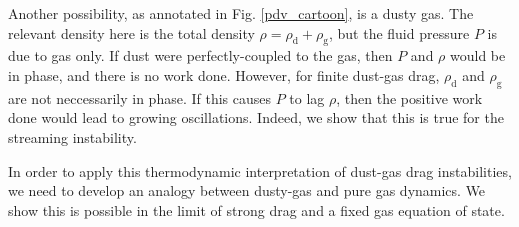 \documentclass[iop, numberedappendix]{emulateapj}
\newcommand{\rhod}{\rho_\mathrm{d}}
\newcommand{\rhog}{\rho_\mathrm{g}}
\begin{document}

Another possibility, as annotated in Fig. \ref{pdv_cartoon}, is a dusty gas. The
relevant density here is the total density $\rho = \rhod + \rhog$, 
but the fluid pressure $P$ is due to gas only. If dust were 
perfectly-coupled to the gas, then $P$ and $\rho$ would be in phase, 
and there is no work done. However, for finite dust-gas drag, $\rhod$ and
$\rhog$ are not neccessarily in phase. If this causes $P$ to lag
$\rho$, then the positive work done would lead to growing
oscillations. Indeed, we show that this is true for the streaming
instability. 

In order to apply this thermodynamic interpretation of dust-gas drag
instabilities, we need to develop an analogy between dusty-gas
and pure gas dynamics. We show this is possible in the limit of
strong drag and a fixed gas equation of state. 







\appendix




\end{document}
